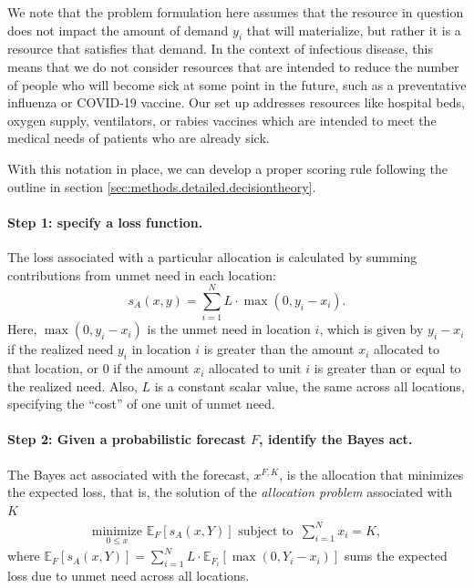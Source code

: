 \documentclass{article}\usepackage[]{graphicx}\usepackage[]{xcolor}
\begin{document}
We note that the problem formulation here assumes that the resource in question does not impact the amount of demand $y_i$ that will materialize, but rather it is a resource that satisfies that demand. In the context of infectious disease, this means that we do not consider resources that are intended to reduce the number of people who will become sick at some point in the future, such as a preventative influenza or COVID-19 vaccine. Our set up addresses resources like hospital beds, oxygen supply, ventilators, or rabies vaccines which are intended to meet the medical needs of patients who are already sick.

With this notation in place, we can develop a proper scoring rule following the outline in section \ref{sec:methods.detailed.decisiontheory}.

\paragraph{Step 1: specify a loss function.} The loss associated with a particular allocation is calculated by summing contributions from unmet need in each location:
\begin{equation}
s_A(x, y) = \sum_{i=1}^N L \cdot \max(0, y_i - x_i). \label{eqn:loss_fn}
\end{equation}
Here, $\max(0, y_i - x_i)$ is the unmet need in location $i$, which is given by $y_i - x_i$ if the realized need $y_i$ in location $i$ is greater than the amount $x_i$ allocated to that location, or $0$ if the amount $x_i$ allocated to unit $i$ is greater than or equal to the realized need. Also, $L$ is a constant scalar value, the same across all locations, specifying the ``cost'' of one unit of unmet need.

\paragraph{Step 2: Given a probabilistic forecast $F$, identify the Bayes act.} The Bayes act associated with the forecast, $x^{F,K}$, is the allocation that minimizes the expected loss, that is, the solution of the \emph{allocation problem} associated with $K$
\begin{align}
    \underset{0 \leq x}{\mathrm{minimize}}\,\, \mathbb{E}_{F} [s_A(x, Y)] \text{ subject to }
     \, \sum_{i=1}^N x_i = K, \label{AP}
\end{align}
where $\mathbb{E}_{F} [s_A(x, Y)] = \sum_{i=1}^{N} L \cdot \mathbb{E}_{F_i}[\max(0, Y_i - x_i)]$ sums the expected loss due to unmet need across all locations.
\end{document}

